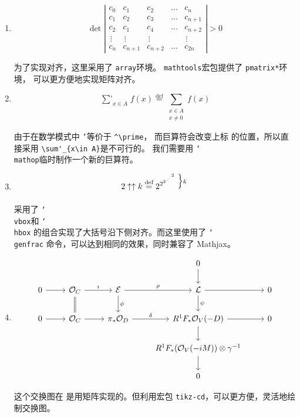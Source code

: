 \documentclass[UTF8,a4paper,scheme=plain,%
punct=quanjiao]{ctexart}
\newcommand*{\cmd}[1]{\texttt{\char`\\#1}}
\begin{document}
\begin{enumerate}[label=Challenge \arabic*]
\item
  \[\det\left|
      \begin{array}{*{5}{l}}
        c_0&c_1&c_2&\dots&c_n\\
        c_1&c_2&c_3&\dots&c_{n+1}\\
        c_2&c_1&c_4&\dots&c_{n+2}\\
        \,\vdots&\,\vdots&\,\vdots& &\,\vdots\\
        c_n&c_{n+1}&c_{n+2}&\dots&c_{2n}
      \end{array}\right|>0\]

  为了实现对齐，这里采用了 \texttt{array}环境。
  \texttt{mathtools}宏包提供了 \texttt{pmatrix*}环境，
  可以更方便地实现矩阵对齐。

  \index{\cmd{left}}
  \index{\cmd{right}}

\item
  \[\mathop{{\sum}'}_{x\in A}f(x)\stackrel{\textrm{def}}=
    \sum_{\substack{x\in A\\x\neq0}}f(x)\]

  由于在数学模式中 \texttt{'}等价于 \verb|^\prime|，
  而巨算符会改变上标
  的位置，所以直接采用 \verb|\sum'_{x\in A}|是不可行的。
  我们需要用 \cmd{mathop}临时制作一个新的巨算符。

  \index{\cmd{mathop}}
  
\item
  \newcommand*{\bottomalign}[1]%
  {\genfrac{}{}{0pt}{}{#1}{}}
  \[2\uparrow\uparrow k\stackrel{\textrm{def}}=
    2^{2^{2^{\cdot^{\cdot^{\cdot^2}}}}}
    \bottomalign{\Bigr\}\scriptstyle k}
  \]

  采用了 \cmd{vbox}和 \cmd{hbox}
  的组合实现了大括号沿下侧对齐。而这里使用了 \cmd{genfrac}
  命令，可以达到相同的效果，同时兼容了 Mathjax。

\item
  \[\begin{tikzcd}
      & & & 0 \arrow[d]
      & \\
      0 \arrow[r] & \mathcal O_C \arrow[r,"\imath"]
      \arrow[d,equal] & \mathcal E \arrow[r,"\rho"]
      \arrow[d,"\phi"] & \mathcal L \arrow[r] \arrow[d,"\psi"]
      & 0 \\
      0 \arrow[r] & \mathcal O_C \arrow[r] & \pi_*\mathcal O_D
      \arrow[r,"\delta"] & R^1F_*\mathcal O_V(-D) \arrow[r]
      \arrow[d]
      & 0 \\
      & & & R^1F_*(\mathcal O_V(-iM))\otimes\gamma^{-1} \arrow[d] & \\
      & & & 0 &
    \end{tikzcd}
  \]

  这个交换图在 是用矩阵实现的。但利用宏包
  \texttt{tikz-cd}，可以更方便，灵活地绘制交换图。
  
\end{enumerate}

\printindex

\printbibliography
\end{document}
